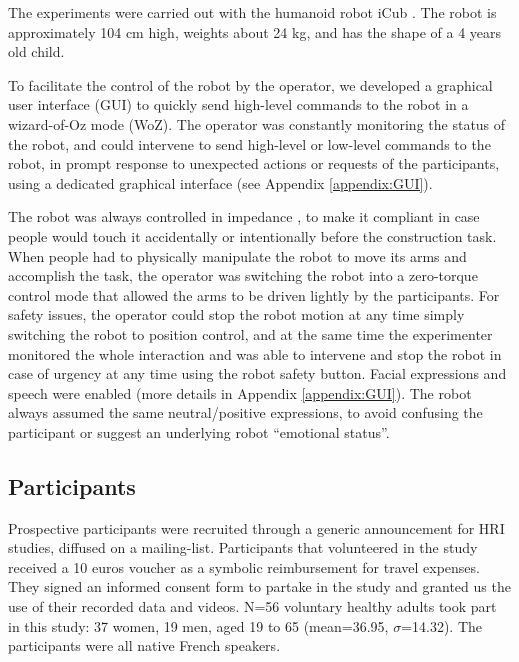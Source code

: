 \documentclass[twocolumn]{svjour3}          %
\begin{document}
The experiments were carried out with the humanoid robot iCub \cite{icub2013}. The robot is approximately 104 cm high, weights about 24 kg, and has the shape of a 4 years old child. 


To facilitate the control of the robot by the operator, we developed a graphical user interface (GUI) to quickly send high-level commands to the robot in a wizard-of-Oz mode (WoZ). 
The operator was constantly monitoring the status of the robot, and could intervene to send high-level or low-level commands to the robot, in prompt response to unexpected actions or requests of the participants, using a dedicated graphical interface (see Appendix \ref{appendix:GUI}).

The robot was always controlled in impedance \cite{idyn2012}, to make it compliant in case people would touch it accidentally or intentionally before the construction task. 
When people had to physically manipulate the robot to move its arms and accomplish the task, the operator was switching the robot into a zero-torque control mode that allowed the arms to be driven lightly by the participants. 
For safety issues, the operator could stop the robot motion at any time simply switching the robot to position control, and at the same time the experimenter monitored the whole interaction 
and was able to intervene and stop the robot in case of urgency at any time using the robot safety button. 
Facial expressions and speech were enabled (more details in Appendix \ref{appendix:GUI}).
The robot always assumed the same neutral/positive expressions, to avoid confusing the participant or suggest an underlying 
robot ``emotional status''.




\subsection{Participants} %

Prospective participants were recruited through a generic announcement for HRI studies, diffused on a mailing-list. 
Participants that volunteered in the study received a 10 euros voucher as a symbolic reimbursement for travel expenses. They signed an informed consent form to partake in the study and granted us the use of their recorded data and videos.
N=56 voluntary healthy adults took part in this study: 37 women, 19 men, aged 19 to 65 (mean=36.95, $\sigma$=14.32). The participants were all native French speakers.
\end{document}
